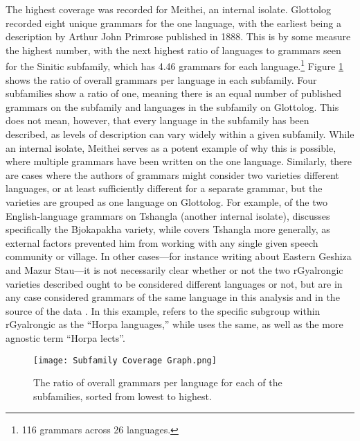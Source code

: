 The highest coverage was recorded for Meithei, an internal isolate. Glottolog recorded eight unique grammars for the one language, with the earliest being a description by Arthur John Primrose published in 1888\nocite{Primrose1888}. This is by some measure the highest number, with the next highest ratio of languages to grammars seen for the Sinitic subfamily, which has 4.46 grammars for each language.\footnote{116 grammars across 26 languages.} Figure \ref{f:Description:SubfamilyCoverageGraph} shows the ratio of overall grammars per language in each subfamily. Four subfamilies show a ratio of one, meaning there is an equal number of published grammars on the subfamily and languages in the subfamily on Glottolog. This does not mean, however, that every language in the subfamily has been described, as levels of description can vary widely within a given subfamily. While an internal isolate, Meithei serves as a potent example of why this is possible, where multiple grammars have been written on the one language. Similarly, there are cases where the authors of grammars might consider two varieties different languages, or at least sufficiently different for a separate grammar, but the varieties are grouped as one language on Glottolog. For example, of the two English-language grammars on Tshangla (another internal isolate),  discusses specifically the Bjokapakha variety, while  covers Tshangla more generally, as external factors prevented him from working with any single given speech community or village. In other cases---for instance  writing about Eastern Geshiza and Mazur Stau---it is not necessarily clear whether or not the two rGyalrongic varieties described ought to be considered different languages or not, but are in any case considered grammars of the same language in this analysis and in the source of the data \cite{glottolog}. In this example,  refers to the specific subgroup within rGyalrongic as the ``Horpa languages,'' while  uses the same, as well as the more agnostic term ``Horpa lects''.

\begin{figure}
        \centering
        \texttt{[image: Subfamily Coverage Graph.png]}
        \caption{The ratio of overall grammars per language for each of the subfamilies, sorted from lowest to highest.}\label{f:Description:SubfamilyCoverageGraph}
\end{figure}

